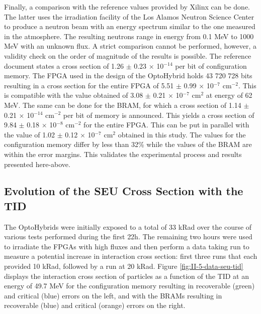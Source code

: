       Finally, a comparison with the reference values provided by Xilinx \cite{XILINX-RELAIBILITY} can be done. The latter uses the irradiation facility of the Los Alamos Neutron Science Center to produce a neutron beam with an energy spectrum similar to the one measured in the atmosphere. The resulting neutrons range in energy from 0.1 MeV to 1000 MeV with an unknown flux. A strict comparison cannot be performed, however, a validity check on the order of magnitude of the results is possible. The reference document states a cross section of 1.26 $\pm$ 0.23 $\times$ 10$^{-14}$ per bit of configuration memory. The FPGA used in the design of the OptoHybrid holds 43 720 728 bits resulting in a cross section for the entire FPGA of 5.51 $\pm$ 0.99 $\times$ 10$^{-7}$ cm$^{-2}$. This is compatible with the value obtained of 3.08 $\pm$ 0.21 $ \times $ 10$^{-7}$ cm$^{2}$ at energy of 62 MeV. The same can be done for the BRAM, for which a cross section of 1.14 $\pm$ 0.21 $ \times $ 10$^{-14}$ cm$^{-2}$ per bit of memory is announced. This yields a cross section of 9.84 $\pm$ 0.18 $\times$ 10$^{-8}$ cm$^{-2}$ for the entire FPGA. This can be put in parallel with the value of 1.02 $\pm$ 0.12 $ \times $ 10$^{-7}$ cm$^2$ obtained in this study. The values for the configuration memory differ by less than 32\% while the values of the BRAM are within the error margins. This validates the experimental process and results presented here-above.

    \subsection{Evolution of the SEU Cross Section with the TID}

      The OptoHybrids were initially exposed to a total of 33 kRad over the course of various tests performed during the first 22h. The remaining two hours were used to irradiate the FPGAs with high fluxes and then perform a data taking run to measure a potential increase in interaction cross section: first three runs that each provided 10 kRad, followed by a run at 20 kRad. Figure \ref{fig:II-5-data-seu-tid} displays the interaction cross section of particles as a function of the TID at an energy of 49.7 MeV for the configuration memory resulting in recoverable (green) and critical (blue) errors on the left, and with the BRAMs resulting in recoverable (blue) and critical (orange) errors on the right. \\

